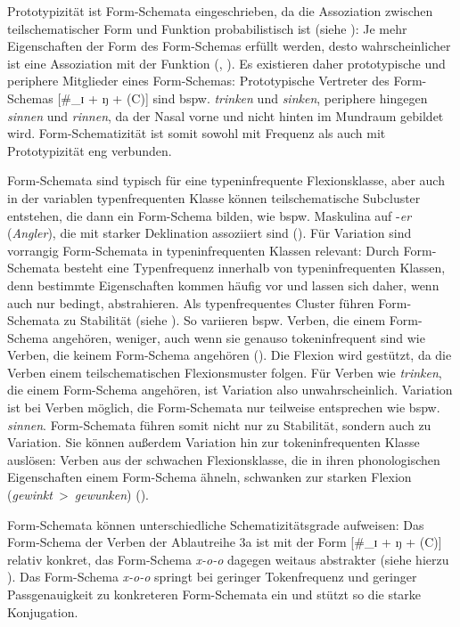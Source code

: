 Prototypizität ist Form-Schemata eingeschrieben, da die Assoziation zwischen teilschematischer Form und Funktion probabilistisch ist (siehe ): Je mehr Eigenschaften der Form des Form-Schemas erfüllt werden, des\-to wahrscheinlicher ist eine Assoziation mit der Funktion (\cite[39]{Rumelhart.1980}, \cite[262--264]{Bybee.1983}). Es existieren daher prototypische und periphere Mitglieder eines Form-Schemas: Prototypische Vertreter des Form-Schemas [\#\_ɪ + ŋ + (C)] sind bspw. \textit{trinken} und \textit{sinken}, periphere hingegen \textit{sinnen} und \textit{rinnen}, da der Nasal vorne und nicht hinten im Mundraum gebildet wird. Form-Schematizität ist somit sowohl mit Frequenz als auch mit Prototypizität eng verbunden. 

Form-Schemata sind typisch für eine typeninfrequente Flexionsklasse, aber auch in der variablen typenfrequenten Klasse können teilschematische Subcluster entstehen, die dann ein Form-Schema bilden, wie bspw. Maskulina auf -\textit{er} (\textit{Angler}), die mit starker Deklination assoziiert sind (\cite[160--161]{Kopcke.2000b}). Für Variation sind vorrangig Form-Schemata in typeninfrequenten Klassen relevant: Durch Form-Schemata besteht eine Typenfrequenz innerhalb von typeninfrequenten Klassen, denn bestimmte Eigenschaften kommen häufig vor und lassen sich daher, wenn auch nur bedingt, abstrahieren. Als typenfrequentes Cluster führen Form-Schemata zu Stabilität (siehe ). So variieren bspw. Verben, die einem Form-Schema angehören, weniger, auch wenn sie genauso tokeninfrequent sind wie Verben, die keinem Form-Schema angehören (\cite[57--58]{Kopcke.1999}). Die Flexion wird gestützt, da die Verben einem teilschematischen Flexionsmuster folgen. Für Verben wie \textit{trinken}, die einem Form-Schema angehören, ist Variation also unwahrscheinlich. Variation ist bei Verben möglich, die Form-Schemata nur teilweise entsprechen wie bspw. \textit{sinnen}. Form-Schemata führen somit nicht nur zu Stabilität, sondern auch zu Variation. Sie können außerdem Variation hin zur tokeninfrequenten Klasse auslösen: Verben aus der schwachen Flexionsklasse, die in ihren phonologischen Eigenschaften einem Form-Schema ähneln, schwanken zur starken Flexion (\textit{gewinkt}~>~\textit{gewunken}) (\cite[56]{Kopcke.1999}). 


Form-Schemata können unterschiedliche Schematizitätsgrade aufweisen: Das Form-Schema der Verben der Ablaut\-reihe 3a ist mit der Form [\#\_ɪ + ŋ + (C)] relativ konkret, das Form-Schema \textit{x-o-o} dagegen weitaus abstrakter (siehe hierzu ). Das Form-Schema \textit{x-o-o} springt bei geringer Tokenfrequenz und geringer Passgenauigkeit zu konkreteren Form-Schemata ein und stützt so die starke Konjugation.  

